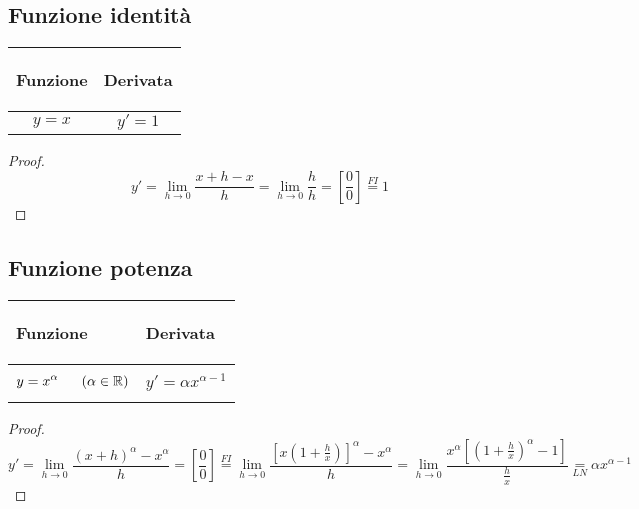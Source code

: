 \subsection{Funzione identità}
\begin{center}
    \begin{tabular}{m{}|m{}}
        \begin{center}
            \textbf{Funzione}
        \end{center}
        & 
        \begin{center}
            \textbf{Derivata}
        \end{center}\\
        \hline
            \[y=x\]&
            \[y'=1\]
    \end{tabular}
\end{center}
\begin{proof}
    \[y'=\lim_{h\to 0}\frac{x+h-x}{h}=\lim_{h\to 0}\frac{h}{h}=\left[\frac{0}{0}\right]\overset{FI}{=}1\]
\end{proof}

\subsection{Funzione potenza}
\begin{center}
    \begin{tabular}{m{}|m{}}
        \begin{center}
            \textbf{Funzione}
        \end{center}
        & 
        \begin{center}
            \textbf{Derivata}
        \end{center}\\
        \hline
            \[y=x^\alpha~~~~~(\alpha \in \mathbb{R})\]&
            \[y'=\alpha x ^{\alpha-1}\]
    \end{tabular}
\end{center}
\begin{proof}
    \[y'=\lim_{h\to 0}\frac{(x+h)^\alpha-x^\alpha}{h}=\left[ \frac{0}{0} \right]\overset{FI}{=}\lim_{h\to 0}\frac{\left[ x \left(1+\frac{h}{x}\right) \right]^\alpha -x^\alpha}{h}=\lim_{h\to 0}\frac{x^\alpha\left[\left(1+\frac{h}{x}\right)^\alpha -1\right] }{\frac{h}{x}}\underset{LN}=\alpha x^{\alpha-1}\]
\end{proof}
